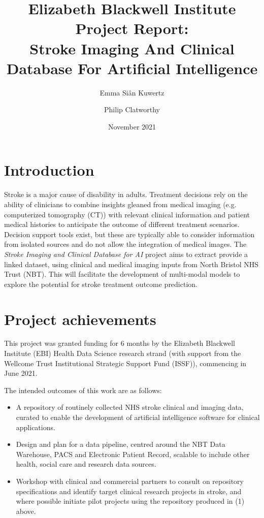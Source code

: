 \documentclass{article}
\title{
  Elizabeth Blackwell Institute Project Report:\\
  Stroke Imaging And Clinical Database For Artificial
  Intelligence
}
\author[1]{Emma Si\^{a}n Kuwertz}
\author[2,3]{Philip Clatworthy}
\affil[1]{Jean Golding Institute, University of Bristol}
\affil[2]{North Bristol NHS Trust}
\affil[3]{Bristol Medical School, University of Bristol}
\date{November 2021}
\begin{document}
\maketitle
\newpage
\tableofcontents
\newpage
\section{Introduction}

Stroke is a major cause of disability in adults. Treatment
decisions rely on the ability of clinicians to combine insights
gleaned from medical imaging (e.g. computerized tomography (CT)) with
relevant clinical information and patient medical histories to anticipate the outcome of different treatment
scenarios. Decision support tools exist, but these are typically able
to consider information from isolated sources and do not allow the
integration of medical images. The \textit{Stroke Imaging and Clinical
Database for AI} project aims to extract provide a linked dataset,
using clinical and medical imaging inputs from North Bristol NHS Trust (NBT). 
This will facilitate the development of multi-modal models to explore the potential for stroke treatment outcome
prediction.\\



\section{Project achievements}

This project was granted funding for 6 months by the Elizabeth
Blackwell Institute (EBI) Health Data Science research strand (with
support from the Wellcome Trust Institutional Strategic Support Fund
(ISSF)), commencing in June 2021.

The intended outcomes of this work are as follows:
\begin{itemize}
\item 	A repository of routinely collected NHS stroke clinical and imaging data, curated to enable the development of artificial intelligence software for clinical applications. 
\item 	Design and plan for a data pipeline, centred around the NBT Data Warehouse, PACS and Electronic Patient Record, scalable to include other health, social care and research data sources. 
\item 	Workshop with clinical and commercial partners to consult on
  repository specifications and identify target clinical research
  projects in stroke, and where possible initiate pilot projects using
  the repository produced in (1) above.
\end{itemize}
\end{document}
